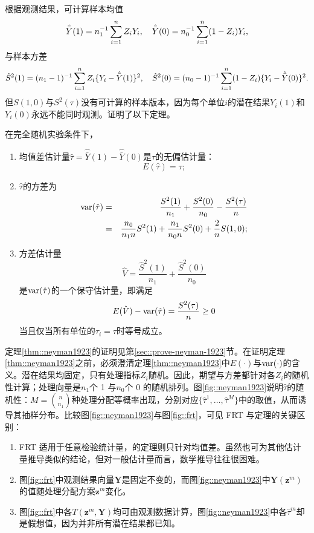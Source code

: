 根据观测结果，可计算样本均值
$$
\hat{\bar{Y}}(1) = n_1^{-1} \sum_{i=1}^n Z_i Y_i,\quad
\hat{\bar{Y}}(0) = n_0^{-1} \sum_{i=1}^n (1-Z_i) Y_i,
$$
与样本方差
$$
\hat{S}^2(1) = (n_1 - 1)^{-1} \sum_{i=1}^n Z_i  \{  Y_i - \hat{\bar{Y}}(1) \}^2,\quad
\hat{S}^2(0) = (n_0 - 1)^{-1} \sum_{i=1}^n (1-Z_i)  \{  Y_i - \hat{\bar{Y}}(0) \}^2 . 
$$
但$S(1,0)$与$S^2(\tau)$没有可计算的样本版本，因为每个单位$i$的潜在结果$Y_i(1)$和$Y_i(0)$永远不能同时观测。\citet{Neyman:1923}证明了以下定理。 




\begin{theorem}
\label{thm::neyman1923}
在完全随机实验条件下， 
\begin{enumerate}
\item
均值差估计量$\hat{\tau} =\hat{\bar{Y}}(1) -  \hat{\bar{Y}}(0)$是$\tau$的无偏估计量：
$$
E(\hat{\tau}) =\tau ;
$$ 
\item
$\hat{\tau} $的方差为
\begin{eqnarray}
\textup{var}(\hat{\tau})  &=&  \frac{S^2(1)}{n_1} + \frac{S^2(0)}{n_0} - \frac{S^2(\tau)}{n} \label{eq::neyman23var} \\
&=& \frac{n_0}{n_1 n} S^2(1) + \frac{n_1}{n_0 n} S^2(0) + \frac{2}{n} S(1,0) ;  \label{eq::neyman23var-equivalent}
\end{eqnarray}
\item\label{neyman-3}
方差估计量 
$$
\hat{V} = \frac{\hat{S}^2(1)}{n_1} + \frac{\hat{S}^2(0)}{n_0}
$$
是$\textup{var}(\hat{\tau})$的一个保守估计量，即满足
$$
E(\hat{V} ) - \textup{var}(\hat{\tau})  = \frac{S^2(\tau)}{n}  \geq 0
$$
当且仅当所有单位的$\tau_i = \tau$时等号成立。 
\end{enumerate}
\end{theorem}

定理\ref{thm::neyman1923}的证明见第\ref{sec::prove-neyman-1923}节。在证明定理\ref{thm::neyman1923}之前，必须澄清定理\ref{thm::neyman1923}中$E(\cdot)$与$\textup{var}(\cdot)$的含义。潜在结果均固定，只有处理指标$Z_i$随机。因此，期望与方差都针对各$Z_i$的随机性计算；处理向量是$n_1$个 1 与$n_0$个 0 的随机排列。图\ref{fig::neyman1923}说明$\hat\tau$的随机性：$M=\binom{n}{n_1}$种处理分配等概率出现，分别对应$\{ \hat\tau^1 , \ldots, \hat\tau^M\}$中的取值，从而诱导其抽样分布。比较图\ref{fig::neyman1923}与图\ref{fig::frt}，可见 FRT 与\citet{Neyman:1923}定理的关键区别：
\begin{enumerate}
\item
FRT 适用于任意检验统计量，\citet{Neyman:1923}的定理则只针对均值差。虽然也可为其他估计量推导类似\citet{Neyman:1923}的结论，但对一般估计量而言，数学推导往往很困难。 

\item
图\ref{fig::frt}中观测结果向量$\bm{Y}$是固定不变的，而图\ref{fig::neyman1923}中$\bm{Y}(\bm{z}^m)$的值随处理分配方案$\bm{z}^m$变化。 

\item
图\ref{fig::frt}中各$T(\bm{z}^m,\bm{Y}) $均可由观测数据计算，图\ref{fig::neyman1923}中各$\hat\tau^m$却是假想值，因为并非所有潜在结果都已知。 
\end{enumerate}

